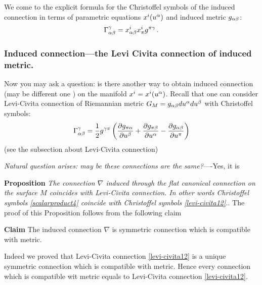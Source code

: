 \documentclass[12pt]{article}
\theoremstyle{theorem}
\numberwithin{equation}{section}
\begin{document}
{We come to the explicit formula for the Christoffel symbols of the induced connection in terms of
parametric equations $x^i(u^\alpha)$ and induced metric $g_{\alpha\beta}$:
\begin{equation}\label{connectionintermsofinducedmetric}
\Gamma^\gamma_{\alpha\beta}=x^i_{\alpha\beta}x^i_\pi g^{\pi\gamma}\,.
\end{equation}

\subsubsection{Induced connection---the Levi Civita connection of induced metric.}

 Now you may ask a question: is there another  way to obtain induced connection (may be different one )
 on the manifold  $x^i=x^i(u^\alpha)$. Recall that one can consider Levi-Civita connection of
 Riemannian metric $G_M=g_{\alpha\beta}du^\alpha du^\beta$ with Christoffel symbols:
                   \begin{equation}\label{levi-civita12}
      \Gamma^\gamma_{\alpha\beta}={1\over 2}g^{\gamma\pi}
      \left({\partial g_{\pi \alpha}\over \partial u^\beta}+{\partial g_{\pi \beta}\over \partial u^\alpha}-
      {\partial g_{\alpha\beta}\over \partial u^\pi}\right)
                   \end{equation}
 (see the subsection about Levi-Civita connection)

 {\sl Natural question arises: may be these connections are the same?}----Yes, it is

              \m

    {\bf Proposition} {\it The connection $\nabla$ induced through the flat canonical connection on the surface
    $M$  coincides with Levi-Civita connection. In other words Christoffel symbols \eqref{scalarproduct4}
    coincide with Christoffel symbols \eqref{levi-civita12}.}.
    The proof of this Proposition follows from the  following claim

              \m
       {\bf Claim} The induced connection $\nabla$ is symmetric connection which is compatible with metric.


     Indeed we proved that Levi-Civita connection \eqref{levi-civita12} is a unique symmetric connection which is compatible with metric.
     Hence every connection which is compatible wit metric equals to Levi-Civita connection \eqref{levi-civita12}.


}
\end{document}
